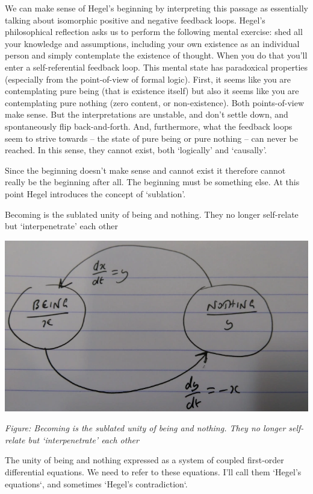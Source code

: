 \documentclass[
]{book}
\begin{document}
We can make sense of Hegel's beginning by interpreting this passage as essentially talking about isomorphic positive and negative feedback loops.
Hegel's philosophical reflection asks us to perform the following mental exercise: shed all your knowledge and assumptions, including your own existence as an individual person and simply contemplate the existence of thought. When you do that you'll enter a self-referential feedback loop. This mental state has paradoxical properties (especially from the point-of-view of formal logic). First, it seems like you are contemplating pure being (that is existence itself) but also it seems like you are contemplating pure nothing (zero content, or non-existence). Both points-of-view make sense. But the interpretations are unstable, and don't settle down, and spontaneously flip back-and-forth. And, furthermore, what the feedback loops seem to strive towards -- the state of pure being or pure nothing -- can never be reached. In this sense, they cannot exist, both `logically' and `causally'.

Since the beginning doesn't make sense and cannot exist it therefore cannot really be the beginning after all. The beginning must be something else. At this point Hegel introduces the concept of `sublation'.

Becoming is the sublated unity of being and nothing. They no longer self-relate but `interpenetrate' each other

\includegraphics{fig/wright_hegel.png}

\emph{Figure: Becoming is the sublated unity of being and nothing. They no longer self-relate but `interpenetrate' each other}

The unity of being and nothing expressed as a system of coupled first-order differential equations. We need to refer to these equations. I'll call them `Hegel's equations`, and sometimes `Hegel's contradiction`.
\end{document}
